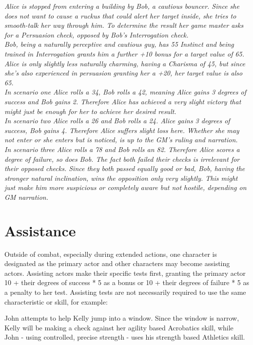 \documentclass[12pt,a4paper,openany]{book}
\begin{document}
	\begin{exampleblock}\textit{
	Alice is stopped from entering a building by Bob, a cautious bouncer. Since she does not want to cause a ruckus that could alert her target inside, she tries to smooth-talk her way through him. To determine the result her game master asks for a Persuasion check, opposed by Bob’s Interrogation check.\\
	Bob, being a naturally perceptive and cautious guy, has 55 Instinct and being trained in Interrogation grants him a further +10 bonus for a target value of 65. Alice is only slightly less naturally charming, having a Charisma of 45, but since she’s also experienced in persuasion granting her a +20, her target value is also 65.\\
	In scenario one Alice rolls a 34, Bob rolls a 42, meaning Alice gains 3 degrees of success and Bob gains 2. Therefore Alice has achieved a very slight victory that might just be enough for her to achieve her desired result.\\
	In scenario two Alice rolls a 26 and Bob rolls a 24. Alice gains 3 degrees of success, Bob gains 4. Therefore Alice suffers slight loss here. Whether she may not enter or she enters but is noticed, is up to the GM’s ruling and narration.\\
	In scenario three Alice rolls a 78 and Bob rolls an 82. Therefore Alice scores a degree of failure, so does Bob. The fact both failed their checks is irrelevant for their opposed checks. Since they both passed equally good or bad, Bob, having the stronger natural inclination, wins the opposition only very slightly. This might just make him more suspicious or completely aware but not hostile, depending on GM narration.\\
		}
	\end{exampleblock}

	\section{Assistance}
	Outside of combat, especially during extended actions, one character is designated as the primary actor and other characters may become assisting actors. Assisting actors make their specific tests first, granting the primary actor 10 + their degrees of success * 5 as a bonus or 10 + their degrees of failure * 5 as a penalty to her test. Assisting tests are not necessarily required to use the same characteristic or skill, for example:\par
	\begin{exampleblock}
		John attempts to help Kelly jump into a window. Since the window is narrow, Kelly will be making a check against her agility based Acrobatics skill, while John - using controlled, precise strength - uses his strength based Athletics skill.
	\end{exampleblock}
\end{document}
